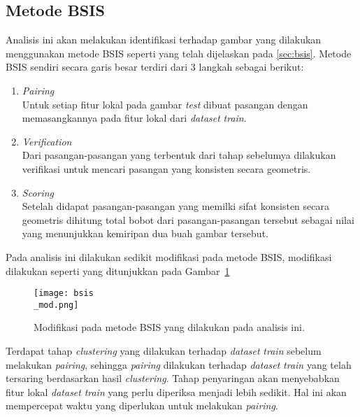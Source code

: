 \subsection{Metode BSIS}
Analisis ini akan melakukan identifikasi terhadap gambar yang dilakukan menggunakan metode BSIS seperti yang telah dijelaskan pada \ref{sec:bsis}. Metode BSIS sendiri secara garis besar terdiri dari 3 langkah sebagai berikut:
\begin{enumerate}
	\item \textit{Pairing} \\
	Untuk setiap fitur lokal pada gambar \textit{test} dibuat pasangan dengan memasangkannya pada fitur lokal dari \textit{dataset} \textit{train}.
	\item \textit{Verification} \\
	Dari pasangan-pasangan yang terbentuk dari tahap sebelumya dilakukan verifikasi untuk mencari pasangan yang konsisten secara geometris.
	\item \textit{Scoring} \\
	Setelah didapat pasangan-pasangan yang memilki sifat konsisten secara geometris dihitung total bobot dari pasangan-pasangan tersebut sebagai nilai yang menunjukkan kemiripan dua buah gambar tersebut.
\end{enumerate}
Pada analisis ini dilakukan sedikit modifikasi pada metode BSIS, modifikasi dilakukan seperti yang ditunjukkan pada Gambar~\ref{fig:bsis_mod}
\begin{figure}[H]
	\centering
	\texttt{[image: bsis\\\_mod.png]}
	\caption{Modifikasi pada metode BSIS yang dilakukan pada analisis ini.}
	\label{fig:bsis_mod}
\end{figure}

Terdapat tahap \textit{clustering} yang dilakukan terhadap \textit{dataset} \textit{train} sebelum melakukan \textit{pairing}, sehingga \textit{pairing} dilakukan terhadap \textit{dataset} \textit{train} yang telah tersaring berdasarkan hasil \textit{clustering}. Tahap penyaringan akan menyebabkan fitur lokal \textit{dataset} \textit{train} yang perlu diperiksa menjadi lebih sedikit. Hal ini akan mempercepat waktu yang diperlukan untuk melakukan \textit{pairing}.



